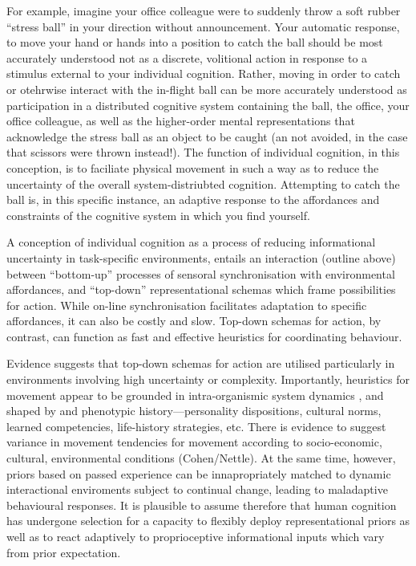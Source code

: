 \documentclass[12pt]{report}
\begin{document}
For example, imagine your office colleague were to suddenly throw a soft rubber ``stress ball'' in your direction without announcement. Your automatic response, to move your hand or hands into a position to catch the ball should be most accurately understood not as a discrete, volitional action in response to a stimulus external to your individual cognition. Rather, moving in order to catch or otehrwise interact with the in-flight ball can be more accurately understood as participation in a distributed cognitive system containing the ball, the office, your office colleague, as well as the higher-order mental representations that acknowledge the stress ball as an object to be caught (an not avoided, in the case that scissors were thrown instead!). The function of individual cognition, in this conception, is to faciliate physical movement in such a way as to reduce the uncertainty of the overall system-distriubted cognition.  Attempting to catch the ball is, in this specific instance, an adaptive response to the affordances and constraints of the cognitive system in which you find yourself.

A conception of individual cognition as a process of reducing informational uncertainty in task-specific environments, entails an interaction (outline above) between ``bottom-up'' processes of sensoral synchronisation with environmental affordances, and ``top-down'' representational schemas which frame possibilities for action.  While on-line synchronisation facilitates adaptation to specific affordances, it can also be costly and slow.  Top-down schemas for action, by contrast, can function as fast and effective heuristics for coordinating behaviour.

Evidence suggests that top-down schemas for action are utilised particularly in environments involving high uncertainty or complexity.
Importantly, heuristics for movement appear to be grounded in intra-organismic system dynamics \citep{Vesper2013}, and shaped by and phenotypic history—personality dispositions, cultural norms, learned competencies, life-history strategies, etc.  There is evidence to suggest variance in movement tendencies for movement according to socio-economic, cultural, environmental conditions (Cohen/Nettle).  At the same time, however, priors based on passed experience can be innapropriately matched to dynamic interactional enviroments subject to continual change, leading to maladaptive behavioural responses.  It is plausible to assume therefore that human cognition has undergone selection for a capacity to flexibly deploy representational priors as well as to react adaptively to proprioceptive informational inputs which vary from prior expectation.
\end{document}
